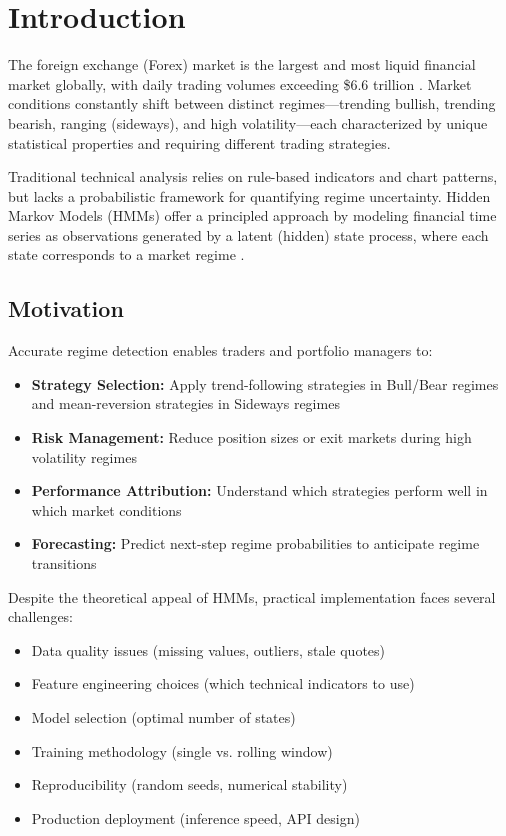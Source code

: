 \documentclass[conference]{IEEEtran}
\begin{document}
\section{Introduction}
The foreign exchange (Forex) market is the largest and most liquid financial market globally, with daily trading volumes exceeding \$6.6 trillion \cite{bis2022}. Market conditions constantly shift between distinct regimes---trending bullish, trending bearish, ranging (sideways), and high volatility---each characterized by unique statistical properties and requiring different trading strategies.

Traditional technical analysis relies on rule-based indicators and chart patterns, but lacks a probabilistic framework for quantifying regime uncertainty. Hidden Markov Models (HMMs) offer a principled approach by modeling financial time series as observations generated by a latent (hidden) state process, where each state corresponds to a market regime \cite{hassan2005, kritzman2012}.

\subsection{Motivation}
Accurate regime detection enables traders and portfolio managers to:
\begin{itemize}
\item \textbf{Strategy Selection:} Apply trend-following strategies in Bull/Bear regimes and mean-reversion strategies in Sideways regimes
\item \textbf{Risk Management:} Reduce position sizes or exit markets during high volatility regimes
\item \textbf{Performance Attribution:} Understand which strategies perform well in which market conditions
\item \textbf{Forecasting:} Predict next-step regime probabilities to anticipate regime transitions
\end{itemize}

Despite the theoretical appeal of HMMs, practical implementation faces several challenges:
\begin{itemize}
\item Data quality issues (missing values, outliers, stale quotes)
\item Feature engineering choices (which technical indicators to use)
\item Model selection (optimal number of states)
\item Training methodology (single vs. rolling window)
\item Reproducibility (random seeds, numerical stability)
\item Production deployment (inference speed, API design)
\end{itemize}
\end{document}
